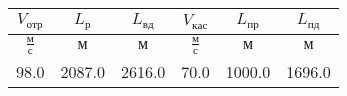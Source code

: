 \begin{tabular}{|c|c|c|c|c|c|}
\hline
$V_{отр}$ & $L_{р}$ & $L_{вд}$ & $V_{кас}$ & $L_{пр}$ & $L_{пд}$ \\ 
\hline
$\frac{м}{с}$ & $м$ & $м$ & $\frac{м}{с}$ & $м$ & $м$ \\ 
\hline
98.0 & 2087.0 & 2616.0 & 70.0 & 1000.0 & 1696.0 \\ 
\hline
\end{tabular}